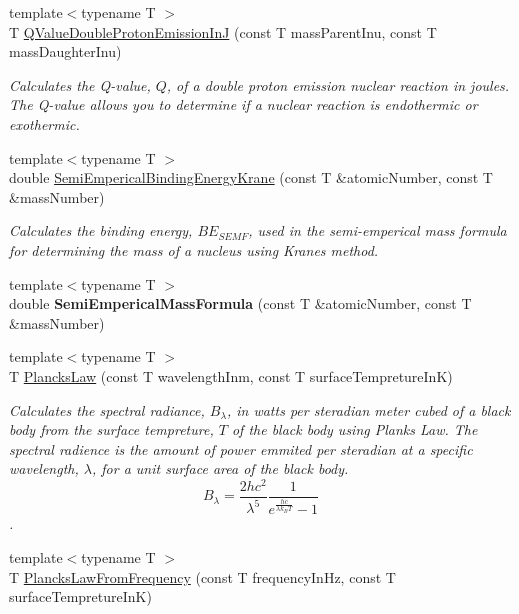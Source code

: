 \begin{DoxyCompactItemize}
{\footnotesize template$<$typename T $>$ }\\T \mbox{\hyperlink{group___e_g_x_phys-_q_value-_proton_emission_gab8979dd25aeac115834a4a8b233fec6f}{Q\+Value\+Double\+Proton\+Emission\+InJ}} (const T mass\+Parent\+Inu, const T mass\+Daughter\+Inu)
\begin{DoxyCompactList}\small\item\em Calculates the Q-\/value, $Q$, of a double proton emission nuclear reaction in joules. The Q-\/value allows you to determine if a nuclear reaction is endothermic or exothermic. \end{DoxyCompactList}\item 
{\footnotesize template$<$typename T $>$ }\\double \mbox{\hyperlink{group___e_g_x_phys-_semi_empirical_mass_formula_ga99c5a87be2c76d3fa4852654c3fd59a9}{Semi\+Emperical\+Binding\+Energy\+Krane}} (const T \&atomic\+Number, const T \&mass\+Number)
\begin{DoxyCompactList}\small\item\em Calculates the binding energy, $BE_{SEMF}$, used in the semi-\/emperical mass formula for determining the mass of a nucleus using Krane\textquotesingle{}s method. \end{DoxyCompactList}\item 
{\footnotesize template$<$typename T $>$ }\\double {\bfseries Semi\+Emperical\+Mass\+Formula} (const T \&atomic\+Number, const T \&mass\+Number)
\item 
{\footnotesize template$<$typename T $>$ }\\T \mbox{\hyperlink{group___e_g_x_phys-_electrodynamics-_black_body-_plancks_law_ga44d8dc3e072ffc7d860cd8f07463f091}{Plancks\+Law}} (const T wavelength\+Inm, const T surface\+Tempreture\+InK)
\begin{DoxyCompactList}\small\item\em Calculates the spectral radiance, $B_{\lambda}$, in watts per steradian meter cubed of a black body from the surface tempreture, $T$ of the black body using Plank\textquotesingle{}s Law. The spectral radience is the amount of power emmited per steradian at a specific wavelength, $\lambda$, for a unit surface area of the black body. \[ B_{\lambda} = \dfrac{2 h c^2}{\lambda^5} \dfrac{1}{e^{\frac{hc}{\lambda k_B T}} - 1} \]. \end{DoxyCompactList}\item 
{\footnotesize template$<$typename T $>$ }\\T \mbox{\hyperlink{group___e_g_x_phys-_electrodynamics-_black_body-_plancks_law_ga68aae82f8a086831358c4a61c8c80ba4}{Plancks\+Law\+From\+Frequency}} (const T frequency\+In\+Hz, const T surface\+Tempreture\+InK)

\end{DoxyCompactItemize}
